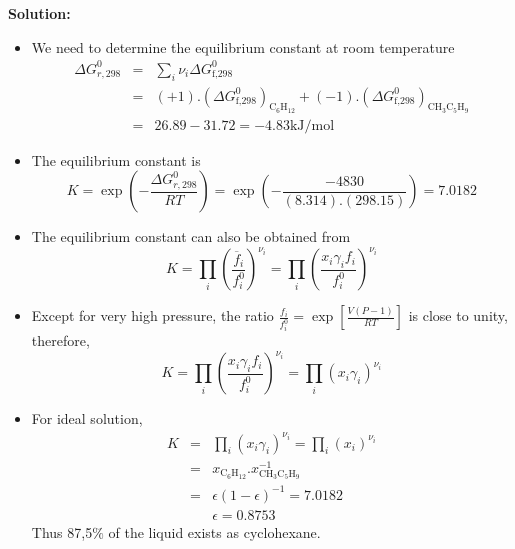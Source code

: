 \documentclass[12pts,a4paper,amsmath,amssymb,floatfix]{article}%
\newcommand{\frc}{\displaystyle\frac}
\begin{document}
\begin{enumerate}[1)]
\bigskip

{\large{\bf Solution:}}

   \begin{itemize}
      \item We need to determine the equilibrium constant at room temperature
         \begin{eqnarray}
           \Delta G^{0}_{r,298} &=& \sum\limits_{i}\nu_{i}\Delta G^{0}_{\text{f,298}} \nonumber \\
                             &=& (+1).\left(\Delta G^{0}_{\text{f,298}}\right)_{\text{C}_{6}\text{H}_{12}} + (-1).\left(\Delta G^{0}_{\text{f,298}}\right)_{\text{CH}_{3}\text{C}_{5}\text{H}_{9}} \nonumber \\ 
                             &=& 26.89-31.72 = -4.83 \text{kJ/mol} \nonumber
         \end{eqnarray}
      \item The equilibrium constant is
         \begin{displaymath}
             K = \exp\left(-\frc{\Delta G^{0}_{r,298}}{RT}\right) = \exp\left(-\frc{-4830}{(8.314).(298.15)}\right) = 7.0182
         \end{displaymath}
      \item The equilibrium constant can also be obtained from 
         \begin{displaymath}
            K = \prod\limits_{i}\left(\frc{\overline{f}_{i}}{f^{0}_{i}}\right)^{\nu_{i}} = \prod\limits_{i}\left(\frc{x_{i}\gamma_{i}f_{i}}{f^{0}_{i}}\right)^{\nu_{i}}
         \end{displaymath}
      \item Except for very high pressure, the ratio $\frc{f_{i}}{f^{0}_{i}}=\exp\left[\frc{V\left(P-1\right)}{RT}\right]$ is close to unity, therefore,
         \begin{displaymath}
            K = \prod\limits_{i}\left(\frc{x_{i}\gamma_{i}f_{i}}{f^{0}_{i}}\right)^{\nu_{i}} = \prod\limits_{i}\left(x_{i}\gamma_{i}\right)^{\nu_{i}}
         \end{displaymath}
      \item For ideal solution,
         \begin{eqnarray}
            K &=& \prod\limits_{i}\left(x_{i}\gamma_{i}\right)^{\nu_{i}} = \prod\limits_{i}\left(x_{i}\right)^{\nu_{i}} \nonumber \\
               &=& x_{\text{C}_{6}\text{H}_{12}}.x_{\text{CH}_{3}\text{C}_{5}\text{H}_{9}}^{-1} \nonumber \\
               &=& \epsilon\left(1-\epsilon\right)^{-1} = 7.0182 \nonumber \\
              && \epsilon = 0.8753
         \end{eqnarray}
         Thus 87,5$\%$ of the liquid exists as cyclohexane.


   \end{itemize}
\clearpage


\end{enumerate}
\end{document}
